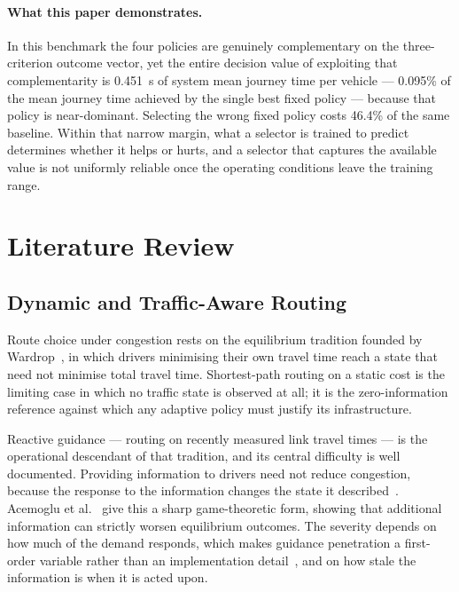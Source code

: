 \documentclass[runningheads]{llncs}
\begin{document}
\paragraph{What this paper demonstrates.}
In this benchmark the four policies are genuinely complementary on the
three-criterion outcome vector, yet the entire decision value of exploiting
that complementarity is 0.451~s of system mean journey time per vehicle
--- 0.095\% of the mean journey time achieved by the single best
fixed policy --- because that policy is near-dominant. Selecting the wrong
fixed policy costs 46.4\% of the same baseline. Within that
narrow margin, what a selector is trained to predict determines whether it
helps or hurts, and a selector that captures the available value is not
uniformly reliable once the operating conditions leave the training range.

\section{Literature Review}
\label{sec:lit}

\subsection{Dynamic and Traffic-Aware Routing}

Route choice under congestion rests on the equilibrium tradition founded by
Wardrop~\cite{wardrop1952}, in which drivers minimising their own travel time
reach a state that need not minimise total travel time. Shortest-path routing
on a static cost is the limiting case in which no traffic state is observed at
all; it is the zero-information reference against which any adaptive policy
must justify its infrastructure.

Reactive guidance --- routing on recently measured link travel times --- is the
operational descendant of that tradition, and its central difficulty is well
documented. Providing information to drivers need not reduce congestion,
because the response to the information changes the state it
described~\cite{arnott1991information}. Acemoglu et
al.~\cite{acemoglu2018braess} give this a sharp game-theoretic form, showing
that additional information can strictly worsen equilibrium outcomes. The
severity depends on how much of the demand responds, which makes guidance
penetration a first-order variable rather than an implementation
detail~\cite{yang1998penetration}, and on how stale the information is when it
is acted upon.
\end{document}
